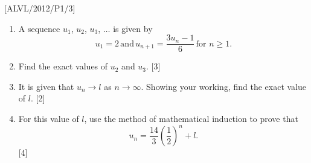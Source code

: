 \item {[}ALVL/2012/P1/3{]}
\begin{enumerate}
\item A sequence $u_{1}$, $u_{2}$, $u_{3}$, $\dots$ is given by 
\[
u_{1}=2\,\text{and}\,u_{n+1}=\frac{3u_{n}-1}{6}\,\text{for }n\geq1.
\]
\item Find the exact values of $u_{2}$ and $u_{3}$. \hfill{}{[}3{]}
\item It is given that $u_{n}\rightarrow l$ as $n\rightarrow\infty$. Showing
your working, find the exact value of $l$. \hfill{} {[}2{]}
\item For this value of $l$, use the method of mathematical induction to
prove that 
\[
u_{n}=\frac{14}{3}\left(\frac{1}{2}\right)^{n}+l.
\]
 \hfill{}{[}4{]}
\end{enumerate}
